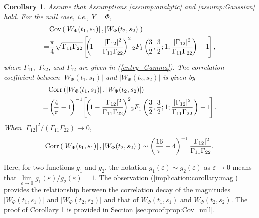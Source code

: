 \documentclass{amsart}
\newtheorem{Corollary}{Corollary}
\begin{document}
\begin{Corollary}\label{prop:Cov_null}
Assume that Assumptions \ref{assump:analytic} and \ref{assump:Gaussian} hold.
For the null case, i.e.,  $Y=\Phi$,
\begin{align}\notag
&\textup{Cov}\left(\left|W_{\Phi}(t_{1},s_{1})\right|,\left|W_{\Phi}(t_{2},s_{2})\right|\right)
\\\notag=&\frac{\pi}{4}\sqrt{\Gamma_{11}\Gamma_{22}}
\left[\hspace{-0.1cm}\left(\hspace{-0.06cm}1-\frac{|\Gamma_{12}|^{2}}{\Gamma_{11}\Gamma_{22}}\hspace{-0.06cm}\right)^2
{}_2F_1\left(\hspace{-0.06cm}\frac{3}{2},\frac{3}{2};1;\frac{|\Gamma_{12}|^{2}}{\Gamma_{11}\Gamma_{22}}\hspace{-0.06cm}\right)-1\hspace{-0.05cm}\right],
\end{align}
where $\Gamma_{11},$ $\Gamma_{22}$, and $\Gamma_{12}$ are given in (\ref{entry_Gamma}).
The correlation coefficient between
$|W_{\Phi}(t_{1},s_{1})|$ and $|W_{\Phi}(t_{2},s_{2})|$ is given by
\begin{align}\label{eq:correlation_mag}
&\textup{Corr}\left(\left|W_{\Phi}(t_{1},s_{1})\right|,\left|W_{\Phi}(t_{2},s_{2})\right|\right)
\\\notag=&\left(\hspace{-0.06cm}\frac{4}{\pi}-1\hspace{-0.06cm}\right)^{-1}
\hspace{-0.06cm}\left[\hspace{-0.06cm}\left(\hspace{-0.06cm}1-\frac{|\Gamma_{12}|^{2}}{\Gamma_{11}\Gamma_{22}}\hspace{-0.06cm}\right)^2
\hspace{-0.06cm}{}_2F_1\left(\frac{3}{2},\frac{3}{2};1;\frac{|\Gamma_{12}|^{2}}{\Gamma_{11}\Gamma_{22}}\right)-1\hspace{-0.06cm}\right].
\end{align}
When $|\Gamma_{12}|^{2}/(\Gamma_{11}\Gamma_{22})\rightarrow 0,$
\begin{align}\label{implication:corollary:mag}
\textup{Corr}\left(\left|W_{\Phi}(t_{1},s_{1})\right|,\left|W_{\Phi}(t_{2},s_{2})\right|\right)
\sim \left(\frac{16}{\pi}-4\right)^{-1}\frac{|\Gamma_{12}|^{2}}{\Gamma_{11}\Gamma_{22}}.
\end{align}
\end{Corollary}
Here, for two functions $g_{1}$ and $g_{2}$, the notation $g_{1}(\varepsilon)\sim g_{2}(\varepsilon)$ as $\varepsilon\rightarrow 0$ means that $\underset{\varepsilon\rightarrow 0}{\lim}g_{1}(\varepsilon)/g_{2}(\varepsilon)= 1$. The observation (\ref{implication:corollary:mag}) provides the relationship between the correlation decay of
the magnitudes $|W_{\Phi}(t_{1},s_{1})|$ and $|W_{\Phi}(t_{2},s_{2})|$
and that of $W_{\Phi}(t_{1},s_{1})$ and $W_{\Phi}(t_{2},s_{2})$.
The proof of Corollary \ref{prop:Cov_null} is provided in Section \ref{sec:proof:prop:Cov_null}.
\end{document}
